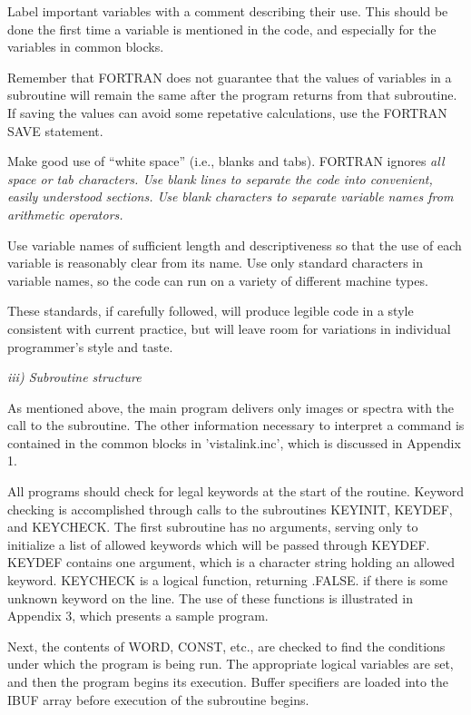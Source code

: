\hang
{}Label important variables with a comment
describing their use.  This should be done the first time a variable
is mentioned in the code, and especially for the variables in common
blocks. 

\hang
{}Remember that FORTRAN does not guarantee
that the values of variables in a subroutine will remain the same
after the program returns from that
subroutine. If saving the values can avoid
some repetative calculations, use the FORTRAN SAVE statement. 

\hang
{}Make good use of ``white space'' (i.e.,
blanks and tabs). FORTRAN ignores \it all \rm space or tab characters.
Use blank lines to separate the code into convenient, easily
understood sections. Use blank characters to separate variable names
from arithmetic operators. 

\hang
{}Use variable names of sufficient
length and descriptiveness so that the use of each variable is
reasonably clear from its name. Use only standard characters in variable
names, so the code can run on a variety of different machine types.

	These standards, if carefully followed, will produce legible
code in a style consistent with current practice, but will leave room
for variations in individual programmer's style and taste. 

\vskip 0.25in
\Sskip
\centerline {\it iii)  Subroutine structure}

\vskip 0.125in
	As mentioned above, the main program delivers only images or
spectra with the call to the subroutine.  The other information
necessary to interpret a command is contained in the common blocks in
'vistalink.inc', which is discussed in Appendix 1.

	All programs should check for legal keywords
at the start of the routine. 
Keyword checking is accomplished through calls to the
subroutines KEYINIT, KEYDEF, and KEYCHECK.  
The first subroutine has
no arguments, serving only to initialize a list of allowed keywords
which will be passed through KEYDEF.  KEYDEF contains one argument,
which is a character string holding an allowed keyword. KEYCHECK is a
logical function, returning .FALSE. if there is some unknown keyword
on the line.  The use of these functions is illustrated in Appendix 3,
which presents a sample program. 

	Next, the contents of WORD, CONST, etc., are checked to find
the conditions under which the program is being run.  The appropriate
logical variables are set, and then the program begins its execution.
Buffer specifiers are loaded into the IBUF array before execution of
the subroutine begins. 

